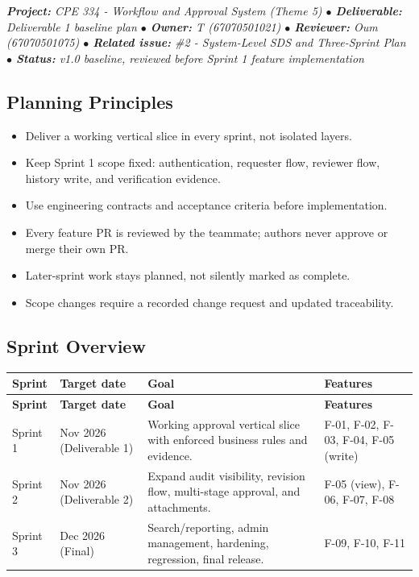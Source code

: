 \documentclass[11pt,a4paper]{article}
\begin{document}
\begin{tcolorbox}[colback=lightbg,colframe=secondary,arc=2mm,boxrule=0.8pt]\small\itshape
\textbf{Project:} CPE 334 - Workflow and Approval System (Theme 5) \quad $\bullet$ \quad \textbf{Deliverable:} Deliverable 1 baseline plan \quad $\bullet$ \quad \textbf{Owner:} T (67070501021) \quad $\bullet$ \quad \textbf{Reviewer:} Oum (67070501075) \quad $\bullet$ \quad \textbf{Related issue:} \#2 - System-Level SDS and Three-Sprint Plan \quad $\bullet$ \quad \textbf{Status:} v1.0 baseline, reviewed before Sprint 1 feature implementation
\end{tcolorbox}


\subsection{Planning Principles}

\begin{itemize}[leftmargin=*,itemsep=2pt,topsep=2pt]
  \item Deliver a working vertical slice in every sprint, not isolated layers.
  \item Keep Sprint 1 scope fixed: authentication, requester flow, reviewer flow, history write, and verification evidence.
  \item Use engineering contracts and acceptance criteria before implementation.
  \item Every feature PR is reviewed by the teammate; authors never approve or merge their own PR.
  \item Later-sprint work stays planned, not silently marked as complete.
  \item Scope changes require a recorded change request and updated traceability.
\end{itemize}

\subsection{Sprint Overview}

\vspace{0.3em}
\begin{longtable}{|>{\RaggedRight}p{1.8cm}|>{\RaggedRight}p{2.2cm}|>{\RaggedRight}p{6.2cm}|>{\RaggedRight}p{4.5cm}|}
\hline
\rowcolor{zenPale}\textbf{Sprint} & \textbf{Target date} & \textbf{Goal} & \textbf{Features} \\ \hline
\endfirsthead
\hline
\rowcolor{zenPale}\textbf{Sprint} & \textbf{Target date} & \textbf{Goal} & \textbf{Features} \\ \hline
\endhead
\hline
\endfoot
Sprint 1 & 8 Nov 2026 (Deliverable 1) & Working approval vertical slice with enforced business rules and evidence. & F-01, F-02, F-03, F-04, F-05 (write) \\ \hline
Sprint 2 & 29 Nov 2026 (Deliverable 2) & Expand audit visibility, revision flow, multi-stage approval, and attachments. & F-05 (view), F-06, F-07, F-08 \\ \hline
Sprint 3 & 13 Dec 2026 (Final) & Search/reporting, admin management, hardening, regression, final release. & F-09, F-10, F-11 \\ \hline
\end{longtable}
\vspace{0.3em}
\end{document}
